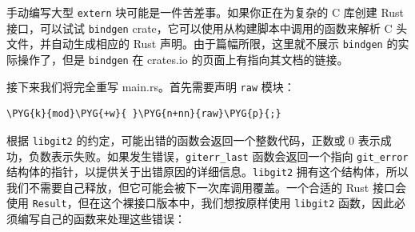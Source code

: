 手动编写大型 \texttt{extern} 块可能是一件苦差事。如果你正在为复杂的 C 库创建 Rust 接口，可以试试 \texttt{bindgen} crate，它可以使用从构建脚本中调用的函数来解析 C 头文件，并自动生成相应的 Rust 声明。由于篇幅所限，这里就不展示 \texttt{bindgen} 的实际操作了，但是 \texttt{bindgen} 在 crates.io 的页面上有指向其文档的链接。

接下来我们将完全重写 main.rs。首先需要声明 \texttt{raw} 模块：

\begin{Verbatim}[commandchars=\\\{\},breaklines=true,breakanywhere=true,fontsize=\codefont,xleftmargin=17bp]
\PYG{k}{mod}\PYG{+w}{ }\PYG{n+nn}{raw}\PYG{p}{;}
\end{Verbatim}

根据 \texttt{libgit2} 的约定，可能出错的函数会返回一个整数代码，正数或 0 表示成功，负数表示失败。如果发生错误，\texttt{giterr\_last} 函数会返回一个指向 \texttt{git\_error} 结构体的指针，以提供关于出错原因的详细信息。\texttt{libgit2} 拥有这个结构体，所以我们不需要自己释放，但它可能会被下一次库调用覆盖。一个合适的 Rust 接口会使用 \texttt{Result}，但在这个裸接口版本中，我们想按原样使用 \texttt{libgit2} 函数，因此必须编写自己的函数来处理这些错误：

